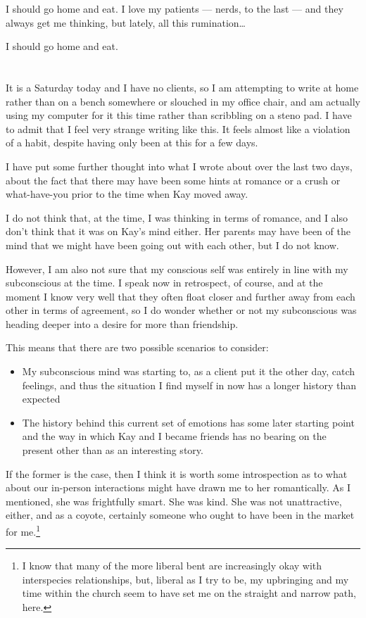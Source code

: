 I should go home and eat. I love my patients --- nerds, to the last --- and they always get me thinking, but lately, all this rumination\ldots{}

I should go home and eat.

\section{}

It is a Saturday today and I have no clients, so I am attempting to write at home rather than on a bench somewhere or slouched in my office chair, and am actually using my computer for it this time rather than scribbling on a steno pad. I have to admit that I feel very strange writing like this. It feels almost like a violation of a habit, despite having only been at this for a few days.

I have put some further thought into what I wrote about over the last two days, about the fact that there may have been some hints at romance or a crush or what-have-you prior to the time when Kay moved away.

I do not think that, at the time, I was thinking in terms of romance, and I also don't think that it was on Kay's mind either. Her parents may have been of the mind that we might have been going out with each other, but I do not know.

However, I am also not sure that my conscious self was entirely in line with my subconscious at the time. I speak now in retrospect, of course, and at the moment I know very well that they often float closer and further away from each other in terms of agreement, so I do wonder whether or not my subconscious was heading deeper into a desire for more than friendship.

This means that there are two possible scenarios to consider:

\begin{itemize}
\tightlist
\item
  My subconscious mind was starting to, as a client put it the other day, catch feelings, and thus the situation I find myself in now has a longer history than expected
\item
  The history behind this current set of emotions has some later starting point and the way in which Kay and I became friends has no bearing on the present other than as an interesting story.
\end{itemize}

If the former is the case, then I think it is worth some introspection as to what about our in-person interactions might have drawn me to her romantically. As I mentioned, she was frightfully smart. She was kind. She was not unattractive, either, and as a coyote, certainly someone who ought to have been in the market for me.\footnote{I know that many of the more liberal bent are increasingly okay with interspecies relationships, but, liberal as I try to be, my upbringing and my time within the church seem to have set me on the straight and narrow path, here.}

